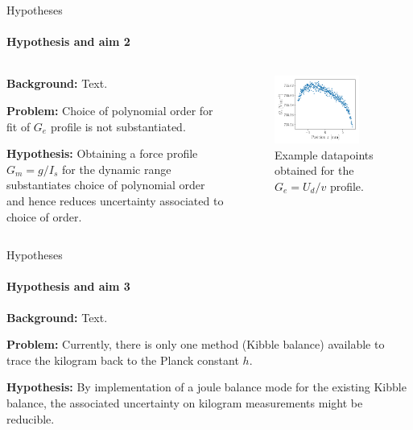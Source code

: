 \documentclass{beamer}
\begin{document}
\begin{frame}[allowframebreaks]{Hypotheses}
  \framesubtitle{Hypothesis and aim 2}

  \begin{columns}
    \begin{column}{0.59\textwidth}
\textbf{Background:} Text.
    
    \textbf{Problem:} Choice of polynomial order for fit of $G_e$ profile is not substantiated.
    
    \textbf{Hypothesis:} Obtaining a force profile $G_m = g/I_s$ for the dynamic range substantiates choice of polynomial order and hence reduces uncertainty associated to choice of order.
    \end{column}
    
    \begin{column}{0.4\textwidth}
      \begin{figure}[h!] 
	\centering
	\includegraphics[width=0.8\textwidth]{figures/Ge_example.pdf}
	\caption{Example datapoints obtained for the $G_e = U_d/v$ profile.}
	\label{fig:U_d_over_v_profile}
      \end{figure}
    \end{column}
  \end{columns}
\end{frame}

\begin{frame}[allowframebreaks]{Hypotheses}
  \framesubtitle{Hypothesis and aim 3}

\textbf{Background:} Text.

\textbf{Problem:} Currently, there is only one method (Kibble balance) available to trace the kilogram back to the Planck constant $h$.

\textbf{Hypothesis:} By implementation of a joule balance mode for the existing Kibble balance, the associated uncertainty on kilogram measurements might be reducible.
\end{frame}
\end{document}
